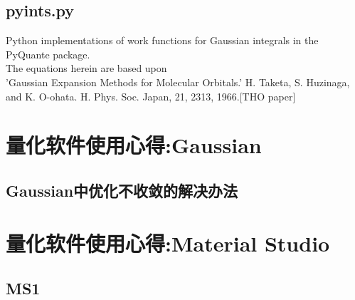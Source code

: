 \subsection{pyints.py}
Python implementations of work functions for Gaussian integrals in the PyQuante package.\\
The equations herein are based upon\\
'Gaussian Expansion Methods for Molecular Orbitals.' H. Taketa, S. Huzinaga, and K. O-ohata. H. Phys. Soc. Japan, 21, 2313, 1966.[THO paper]

\section{量化软件使用心得:Gaussian}
\subsection{Gaussian中优化不收敛的解决办法}

\section{量化软件使用心得:Material Studio}
\subsection{MS1}


